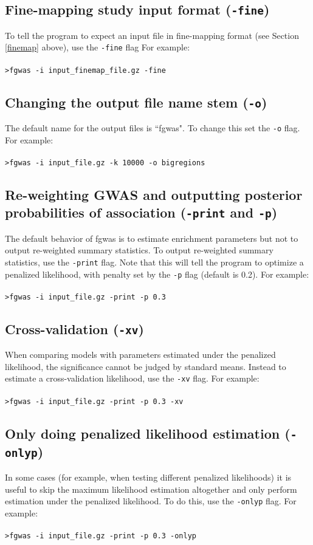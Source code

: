 \documentclass[11pt,titlepage]{article}
\begin{document}
\subsection{Fine-mapping study input format (\texttt{-fine})}
To tell the program to expect an input file in fine-mapping format (see Section \ref{finemap} above), use the \texttt{-fine} flag For example:
\\
\\
\texttt{>fgwas -i input\_finemap\_file.gz -fine}

\subsection{Changing the output file name stem (\texttt{-o})}
The default name for the output files is ``fgwas". To change this set the \texttt{-o} flag. For example:
\\
\\
\texttt{>fgwas -i input\_file.gz -k 10000 -o bigregions}


\subsection{Re-weighting GWAS and outputting posterior probabilities of association (\texttt{-print} and \texttt{-p})}
The default behavior of fgwas is to estimate enrichment parameters but not to output re-weighted summary statistics. To output re-weighted summary statistics, use the \texttt{-print} flag. Note that this will tell the program to optimize a penalized likelihood, with penalty set by the \texttt{-p} flag (default is 0.2). For example:
\\
\\
\texttt{>fgwas -i input\_file.gz -print -p 0.3}

\subsection{Cross-validation (\texttt{-xv})}
When comparing models with parameters estimated under the penalized likelihood, the significance cannot be judged by standard means. Instead to estimate a cross-validation likelihood, use the \texttt{-xv} flag. For example:
\\
\\
\texttt{>fgwas -i input\_file.gz -print -p 0.3 -xv}
\subsection{Only doing penalized likelihood estimation (\texttt{-onlyp})}
In some cases (for example, when testing different penalized likelihoods) it is useful to skip the maximum likelihood estimation altogether and only perform estimation under the penalized likelihood. To do this, use the \texttt{-onlyp} flag. For example:
\\
\\
\texttt{>fgwas -i input\_file.gz -print -p 0.3 -onlyp}
\end{document}
